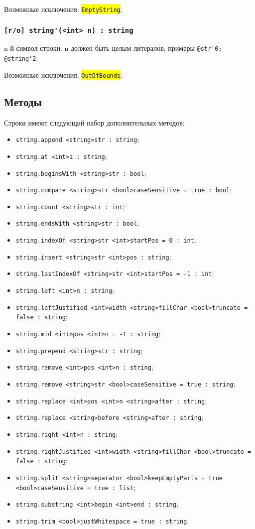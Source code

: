 \documentclass[a4paper, 14pt]{extarticle}
\newcommand{\ferror}[1]{{\fontsize{11pt}{12pt}\tt{\sethlcolor{yellow}\hl{#1}}}}
\newenvironment{icItems}
	{ \begin{itemize} [noitemsep,nolistsep] }
	{ \end{itemize} }
\begin{document}
Возможные исключения: \ferror{EmptyString}.

\subsubsection{\lstinline|[r/o] string'(<int> n) : string|}

n-й символ строки. n должен быть целым литералов, примеры \lstinline|@str'0; @string'2|.

Возможные исключения: \ferror{OutOfBounds}.

\subsection{Методы}

Строки имеют следующий набор дополнительных методов:
\begin{icItems}
\item
	\lstinline|string.append <string>str : string|;
\item
	\lstinline|string.at <int>i : string|;
\item
	\lstinline|string.beginsWith <string>str : bool|;
\item
	\lstinline|string.compare <string>str <bool>caseSensitive = true : bool|;
\item
	\lstinline|string.count <string>str : int|;
\item
	\lstinline|string.endsWith <string>str : bool|;
\item
	\lstinline|string.indexOf <string>str <int>startPos = 0 : int|;
\item
	\lstinline|string.insert <string>str <int>pos : string|;
\item
	\lstinline|string.lastIndexOf <string>str <int>startPos = -1 : int|;
\item
	\lstinline|string.left <int>n : string|;
\item
	\lstinline|string.leftJustified <int>width <string>fillChar <bool>truncate = false : string|;
\item
	\lstinline|string.mid <int>pos <int>n = -1 : string|;
\item
	\lstinline|string.prepend <string>str : string|;
\item
	\lstinline|string.remove <int>pos <int>n : string|;
\item
	\lstinline|string.remove <string>str <bool>caseSensitive = true : string|;
\item
	\lstinline|string.replace <int>pos <int>n <string>after : string|;
\item
	\lstinline|string.replace <string>before <string>after : string|;
\item
	\lstinline|string.right <int>n : string|;
\item
	\lstinline|string.rightJustified <int>width <string>fillChar <bool>truncate = false : string|;
\item
	\lstinline|string.split <string>separator <bool>keepEmptyParts = true <bool>caseSensitive = true : list|;
\item
	\lstinline|string.substring <int>begin <int>end : string|;
\item
	\lstinline|string.trim <bool>justWhitespace = true : string|.
\end{icItems}
\end{document}
